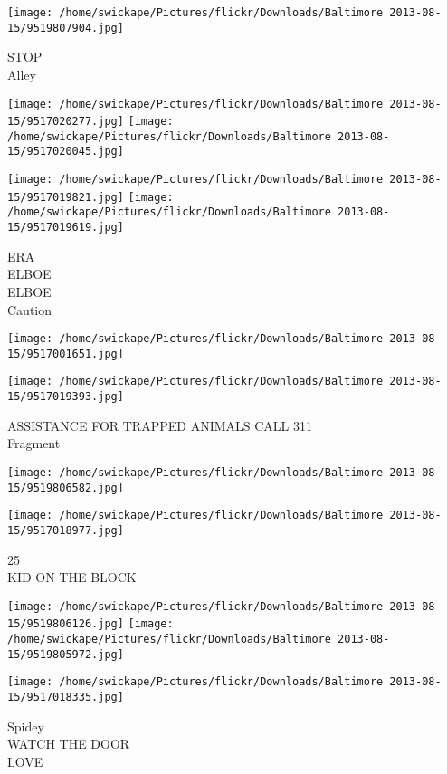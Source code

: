 \documentclass[10pt,letterpaper]{article}
\begin{document}
\vspace{0.25in}
\texttt{[image: /home/swickape/Pictures/flickr/Downloads/Baltimore 2013-08-15/9519807904.jpg]}

STOP\\
Alley
\pagebreak

\texttt{[image: /home/swickape/Pictures/flickr/Downloads/Baltimore 2013-08-15/9517020277.jpg]}
\texttt{[image: /home/swickape/Pictures/flickr/Downloads/Baltimore 2013-08-15/9517020045.jpg]}

\texttt{[image: /home/swickape/Pictures/flickr/Downloads/Baltimore 2013-08-15/9517019821.jpg]}
\texttt{[image: /home/swickape/Pictures/flickr/Downloads/Baltimore 2013-08-15/9517019619.jpg]}

ERA\\
ELBOE\\
ELBOE\\
Caution
\pagebreak

\texttt{[image: /home/swickape/Pictures/flickr/Downloads/Baltimore 2013-08-15/9517001651.jpg]}

\vspace{0.25in}
\texttt{[image: /home/swickape/Pictures/flickr/Downloads/Baltimore 2013-08-15/9517019393.jpg]}

ASSISTANCE FOR TRAPPED ANIMALS CALL 311\\
Fragment
\pagebreak

\texttt{[image: /home/swickape/Pictures/flickr/Downloads/Baltimore 2013-08-15/9519806582.jpg]}

\vspace{0.25in}
\texttt{[image: /home/swickape/Pictures/flickr/Downloads/Baltimore 2013-08-15/9517018977.jpg]}

25\\
KID ON THE BLOCK
\pagebreak

\texttt{[image: /home/swickape/Pictures/flickr/Downloads/Baltimore 2013-08-15/9519806126.jpg]}
\texttt{[image: /home/swickape/Pictures/flickr/Downloads/Baltimore 2013-08-15/9519805972.jpg]}

\vspace{0.25in}
\texttt{[image: /home/swickape/Pictures/flickr/Downloads/Baltimore 2013-08-15/9517018335.jpg]}

Spidey\\
WATCH THE DOOR\\
LOVE
\pagebreak
\end{document}
